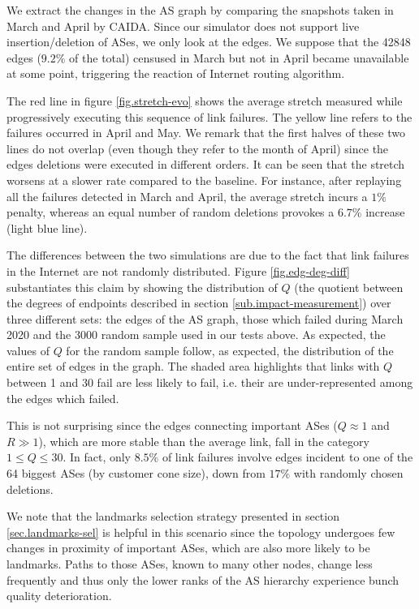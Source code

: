 \documentclass[a4paper,11pt,oneside]{report}
\begin{document}
We extract the changes in the AS graph by comparing the snapshots taken in March and April by CAIDA. Since our simulator does not support live insertion/deletion of ASes, we only look at the edges. We suppose that the 42848 edges ($9.2\%$ of the total) censused in March but not in April became unavailable at some point, triggering the reaction of Internet routing algorithm.

The red line in figure \ref{fig.stretch-evo} shows the average stretch measured while progressively executing this sequence of link failures. The yellow line refers to the failures occurred in April and May. We remark that the first halves of these two lines do not overlap (even though they refer to the month of April) since the edges deletions were executed in different orders.
It can be seen that the stretch worsens at a slower rate compared to the baseline. For instance, after replaying all the failures detected in March and April, the average stretch incurs a $1\%$ penalty, whereas an equal number of random deletions provokes a $6.7\%$ increase (light blue line).

\bigskip
The differences between the two simulations are due to the fact that link failures in the Internet are not randomly distributed.
Figure \ref{fig.edg-deg-diff} substantiates this claim by showing the distribution of $Q$ (the quotient between the degrees of endpoints described in section \ref{sub.impact-measurement}) over three different sets: the edges of the AS graph, those which failed during March 2020 and the 3000 random sample used in our tests above. As expected, the values of $Q$ for the random sample follow, as expected, the distribution of the entire set of edges in the graph.
The shaded area highlights that links with $Q$ between 1 and 30 fail are less likely to fail, i.e. their are under-represented among the edges which failed. 

This is not surprising since the edges connecting important ASes ($Q \approx 1$ and $R \gg 1$), which are more stable than the average link, fall in the category $1 \leq Q \leq 30$.
In fact, only $8.5\%$ of link failures involve edges incident to one of the 64 biggest ASes (by customer cone size), down from $17\%$ with randomly chosen deletions. 

\bigskip
We note that the landmarks selection strategy presented in section \ref{sec.landmarks-sel} is helpful in this scenario since the topology undergoes few changes in proximity of important ASes, which are also more likely to be landmarks. Paths to those ASes, known to many other nodes, change less frequently and thus only the lower ranks of the AS hierarchy experience bunch quality deterioration. 
\end{document}
